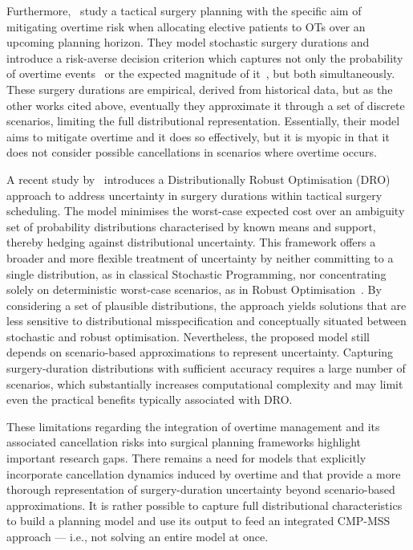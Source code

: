\documentclass[review,3p,authoryear]{elsarticle}
\begin{document}
Furthermore,~\citet{Zhang2020} study a tactical surgery planning with the specific aim of mitigating overtime risk when allocating elective patients to OTs over an upcoming planning horizon. 
They model stochastic surgery durations and introduce a risk-averse decision criterion which captures not only the probability of overtime events~\citep{Shylo2013} or the expected magnitude of it~\citep{Rath2017}, but both simultaneously.
These surgery durations are empirical, derived from historical data, but as the other works cited above, eventually they approximate it through a set of discrete scenarios, limiting the full distributional representation.
Essentially, their model aims to mitigate overtime and it does so effectively, but it is myopic in that it does not consider possible cancellations in scenarios where overtime occurs.

A recent study by~\citet{Shehadeh2026} introduces a Distributionally Robust Optimisation (DRO) approach to address uncertainty in surgery durations within tactical surgery scheduling. 
The model minimises the worst-case expected cost over an ambiguity set of probability distributions characterised by known means and support, thereby hedging against distributional uncertainty. 
This framework offers a broader and more flexible treatment of uncertainty by neither committing to a single distribution, as in classical Stochastic Programming, nor concentrating solely on deterministic worst-case scenarios, as in Robust Optimisation~\citep{shehadeh2022stochastic}. 
By considering a set of plausible distributions, the approach yields solutions that are less sensitive to distributional misspecification and conceptually situated between stochastic and robust optimisation. 
Nevertheless, the proposed model still depends on scenario-based approximations to represent uncertainty. 
Capturing surgery-duration distributions with sufficient accuracy requires a large number of scenarios, which substantially increases computational complexity and may limit even the practical benefits typically associated with DRO.

These limitations regarding the integration of overtime management and its associated cancellation risks into surgical planning frameworks highlight important research gaps.
There remains a need for models that explicitly incorporate cancellation dynamics induced by overtime and that provide a more thorough representation of surgery-duration uncertainty beyond scenario-based approximations.
It is rather possible to capture full distributional characteristics to build a planning model and use its output to feed an integrated CMP-MSS approach --- i.e., not solving an entire model at once.
\end{document}
